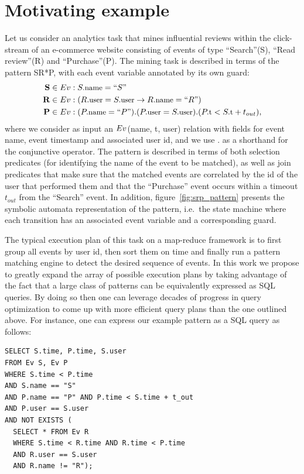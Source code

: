
\section{Motivating example}
\label{sec:mot_example}

Let us consider an analytics task that mines influential reviews
within the click-stream of an e-commerce website consisting of events of type
``Search''(S), ``Read review''(R) and ``Purchase''(P).
The mining task is described in terms of the pattern SR*P, with each event 
variable annotated by its own guard:
\begin{align*}
\text{{\bf S}} \in \Ev&: \facc{S}{name} = ``S"
\\
\text{{\bf R}} \in \Ev&: (\facc{R}{user} = \facc{S}{user} \rightarrow
                          \facc{R}{name} = ``R")
\\
\text{{\bf P}} \in \Ev&: (\facc{P}{name} = ``P") . 
                         (\facc{P}{user} = \facc{S}{user}) . 
                         (\facc{P}{t} < \facc{S}{t} + t_{out}),
\end{align*}
where we consider as input an $Ev$(name, t, user) relation with fields for 
event name, event timestamp and associated user id, and we use $.$ as a 
shorthand for the conjunctive operator. 
The pattern is described in terms of both selection predicates (for identifying 
the name of the event to be matched), as well as join predicates that make sure 
that the matched events are correlated by the id of the user that performed 
them and that the ``Purchase'' event occurs within a timeout $t_{out}$ from the 
``Search'' event. 
In addition, figure~\ref{fig:srp_pattern} presents the symbolic automata 
representation of the pattern, i.e.\ the state machine where each transition 
has an associated event variable and a corresponding guard.
 

The typical execution plan of this task on a map-reduce framework is to first
group all events by user id, then sort them on time and finally run a pattern
matching engine to detect the desired sequence of events.
In this work we propose to greatly expand the array of possible execution plans
by taking advantage of the fact that a large class of patterns can be
equivalently expressed as SQL queries.
By doing so then one can leverage decades of progress in query optimization to
come up with more efficient query plans than the one outlined above.
For instance, one can express our example pattern as a SQL query as follows:
{\small
\begin{verbatim}
SELECT S.time, P.time, S.user
FROM Ev S, Ev P
WHERE S.time < P.time
AND S.name == "S"   
AND P.name == "P" AND P.time < S.time + t_out
AND P.user == S.user
AND NOT EXISTS ( 
  SELECT * FROM Ev R
  WHERE S.time < R.time AND R.time < P.time
  AND R.user == S.user
  AND R.name != "R"); 
\end{verbatim}
}

